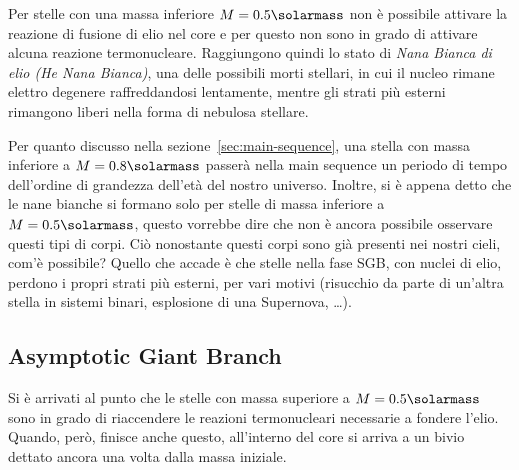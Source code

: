 Per stelle con una massa inferiore $M = 0.5\si{\solarmass}$ non è possibile attivare la reazione di fusione di elio nel core e per questo non sono in grado di attivare alcuna reazione termonucleare. Raggiungono quindi lo stato di \emph{Nana Bianca di elio (He Nana Bianca)}, una delle possibili morti stellari, in cui il nucleo rimane elettro degenere raffreddandosi lentamente, mentre gli strati più esterni rimangono liberi nella forma di nebulosa stellare.

Per quanto discusso nella sezione~\ref{sec:main-sequence}, una stella con massa inferiore a $M = 0.8 \si{\solarmass}$ passerà nella main sequence un periodo di tempo dell'ordine di grandezza dell'età del nostro universo. Inoltre, si è appena detto che le nane bianche si formano solo per stelle di massa inferiore a $M = 0.5 \si{\solarmass}$, questo vorrebbe dire che non è ancora possibile osservare questi tipi di corpi. Ciò nonostante questi corpi sono già presenti nei nostri cieli, com'è possibile? Quello che accade è che stelle nella fase SGB, con nuclei di elio, perdono i propri strati più esterni, per vari motivi (risucchio da parte di un'altra stella in sistemi binari, esplosione di una Supernova, \dots).
\subsection{Asymptotic Giant Branch}\label{sec:asymptotic-giant-branch}

Si è arrivati al punto che le stelle con massa superiore a $M = 0.5 \si{\solarmass}$ sono in grado di riaccendere le reazioni termonucleari necessarie a fondere l'elio. Quando, però, finisce anche questo, all'interno del core si arriva a un bivio dettato ancora una volta dalla massa iniziale. 

